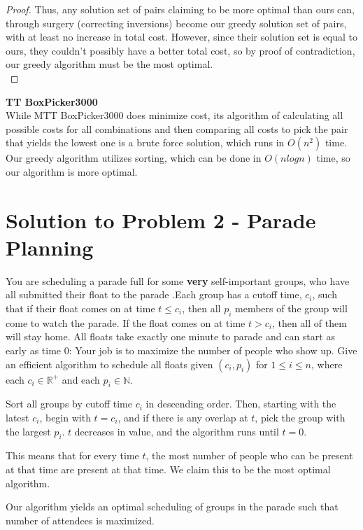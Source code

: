 \documentclass[11pt]{article}
\begin{document}
\begin{proof}
Thus, any solution set of pairs claiming to be more optimal than ours can, through surgery (correcting inversions) become our greedy solution set of pairs, with at least no increase in total cost. However, since their solution set is equal to ours, they couldn't possibly have a better total cost, so by proof of contradiction, our greedy algorithm must be the most optimal.\\
\end{proof}
\textbf{TT BoxPicker3000}\\
While MTT BoxPicker3000 does minimize cost, its algorithm of calculating all possible costs for all combinations and then comparing all costs to pick the pair that yields the lowest one is a brute force solution, which runs in $O(n^2)$ time. Our greedy algorithm utilizes sorting, which can be done in $O(nlogn)$ time, so our algorithm is more optimal.
\newpage

\section*{Solution to Problem 2 - Parade Planning}
You are scheduling a parade full for some \textbf{very} self-important groups, who have all submitted their float to the parade .Each group has a cutoff time, $c_i$, such that if their float comes on at time $t \leq c_i$, then all $p_i$ members of the group will come to watch the parade. If the float comes on at time $t > c_i$, then all of them will stay home. All floats take exactly one minute to parade and can start as early as time 0: Your job is to maximize the number of people who show up. Give an efficient algorithm to schedule all floats given $(c_i, p_i)$ for $1 \leq i \leq n$, where each $c_i \in \mathbb{R}^{+}$ and each $p_i \in \mathbb{N}$.

\begin{algo*}Sort all groups by cutoff time $c_i$ in descending order. Then, starting with the latest $c_i$, begin with $t = c_i$, and if there is any overlap at $t$, pick the group with the largest $p_i$. $t$ decreases in value, and the algorithm runs until $t = 0$.\end{algo*}

This means that for every time $t$, the most number of people who can be present at that time are present at that time. We claim this to be the most optimal algorithm.

\begin{claim*}Our algorithm yields an optimal scheduling of groups in the parade such that number of attendees is maximized.\end{claim*}
\end{document}
